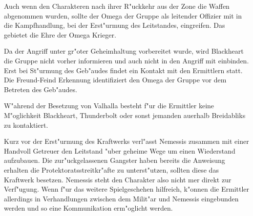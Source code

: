 \begin{remarks}
	Auch wenn den Charakteren nach ihrer R"uckkehr aus der Zone die Waffen abgenommen wurden, sollte der Omega der Gruppe als leitender Offizier mit in die Kampfhandlung, bei der Erst"urmung des Leitstandes, eingreifen. Das gebietet die Ehre der Omega Krieger.
	
	Da der Angriff unter gr"o\3ter Geheimhaltung vorbereitet wurde, wird Blackheart die Gruppe nicht vorher informieren und auch nicht in den Angriff mit einbinden. Erst bei St"urmung des Geb"audes findet ein Kontakt mit den Ermittlern statt. Die Freund-Feind Erkennung identifiziert den Omega der Gruppe vor dem Betreten des Geb"audes. 
	
	W"ahrend der Besetzung von Valhalla besteht f"ur die Ermittler keine M"oglichkeit Blackheart, Thunderbolt oder sonst jemanden au\3erhalb Breidabliks zu kontaktiert.

	Kurz vor der Erst"urmung des Kraftwerks verl"asst Nemessis zusammen mit einer Handvoll Getreuer den Leitstand "uber geheime Wege um einen Wiederstand aufzubauen. Die zur"uckgelassenen Gangster haben bereits die Anweisung erhalten die Protektoratsstreitkr"afte zu unterst"utzen, sollten diese das Kraftwerk besetzen. Nemessis steht den Charakter also nicht mer direkt zur Verf"ugung. Wenn f"ur das weitere Spielgeschehen hilfreich, k"onnen die Ermittler allerdings in Verhandlungen zwischen dem Milit"ar und Nemessis eingebunden werden und so eine Kommunikation erm"oglicht werden. 
\end{remarks}
